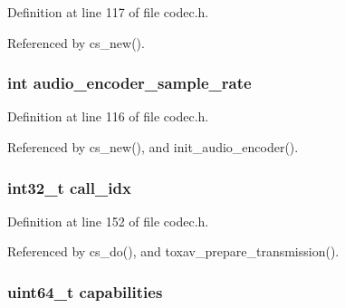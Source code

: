 Definition at line 117 of file codec.\+h.



Referenced by cs\+\_\+new().

\hypertarget{struct___c_s_session_ae40829dc4300d79d3b175c8770b769a4}{
\subsubsection[{audio\+\_\+encoder\+\_\+sample\+\_\+rate}]{\setlength{\rightskip}{0pt plus 5cm}int audio\+\_\+encoder\+\_\+sample\+\_\+rate}}\label{struct___c_s_session_ae40829dc4300d79d3b175c8770b769a4}


Definition at line 116 of file codec.\+h.



Referenced by cs\+\_\+new(), and init\+\_\+audio\+\_\+encoder().

\hypertarget{struct___c_s_session_ad6b287fd08a0cc466cd41bd2e76d5808}{
\subsubsection[{call\+\_\+idx}]{\setlength{\rightskip}{0pt plus 5cm}int32\+\_\+t call\+\_\+idx}}\label{struct___c_s_session_ad6b287fd08a0cc466cd41bd2e76d5808}


Definition at line 152 of file codec.\+h.



Referenced by cs\+\_\+do(), and toxav\+\_\+prepare\+\_\+transmission().

\hypertarget{struct___c_s_session_ac9e675ead9b3559ea462414a0016f6a6}{
\subsubsection[{capabilities}]{\setlength{\rightskip}{0pt plus 5cm}uint64\+\_\+t capabilities}}\label{struct___c_s_session_ac9e675ead9b3559ea462414a0016f6a6}


